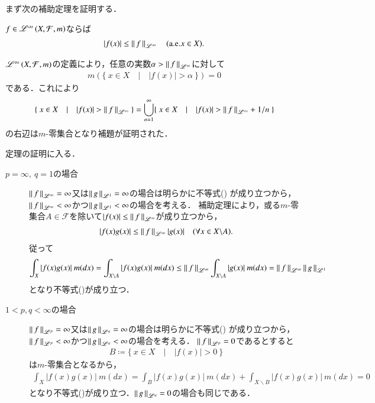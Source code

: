 \begin{prf}
	まず次の補助定理を証明する．
	\begin{lem}
		$f \in \mathscr{L}^{\infty} \left(X,\mathcal{F},m\right)$ならば
		\begin{align}
			|f(x)| \leq \left\|\, f\, \right\|_{\mathscr{L}^\infty} \quad (\mathrm{a.e.}x \in X).
		\end{align}
	\end{lem}
	\begin{prf}
		$\mathscr{L}^{\infty} \left(X,\mathcal{F},m\right)$の定義により，任意の実数$\alpha > \left\|\, f\, \right\|_{\mathscr{L}^\infty}$に対して
		\begin{align}
			m(\{\ x \in X\quad |\quad |f(x)| > \alpha\ \}) = 0
		\end{align}
		である．これにより
		\begin{align}
			\{\ x \in X\quad |\quad |f(x)| > \left\|\, f\, \right\|_{\mathscr{L}^\infty}\ \} = \bigcup_{n =1}^{\infty} \{\ x \in X\quad |\quad |f(x)| > \left\|\, f\, \right\|_{\mathscr{L}^\infty} + 1/n\ \}
		\end{align}
		の右辺は$m$-零集合となり補題が証明された．
		\QED
	\end{prf}
	
	定理の証明に入る．\mbox{}\\
	\begin{description}
		\item[$p = \infty,\ q = 1$の場合]
			$\left\|\, f\, \right\|_{\mathscr{L}^\infty} = \infty$又は$\left\|\, g\, \right\|_{\mathscr{L}^1} = \infty$の場合は明らかに不等式()
			が成り立つから，$\left\|\, f\, \right\|_{\mathscr{L}^\infty} < \infty$かつ$\left\|\, g\, \right\|_{\mathscr{L}^1} < \infty$の場合を考える．
			補助定理により，或る$m$-零集合$A \in \mathcal{F}$を除いて$|f(x)| \leq \left\|\, f\, \right\|_{\mathscr{L}^\infty}$が成り立つから，
			\begin{align}
				|f(x)g(x)| \leq \left\|\, f\, \right\|_{\mathscr{L}^\infty}|g(x)| \quad (\forall x \in X \backslash A).
			\end{align}
			従って
			\begin{align}
				\int_{X} |f(x)g(x)|\ m(dx) = \int_{X \backslash A} |f(x)g(x)|\ m(dx) \leq \left\|\, f\, \right\|_{\mathscr{L}^\infty} \int_{X \backslash A} |g(x)|\ m(dx) 
				= \left\|\, f\, \right\|_{\mathscr{L}^\infty} \left\|\, g\, \right\|_{\mathscr{L}^1}
			\end{align}
			となり不等式()が成り立つ．
		
		\item[$1 < p,q < \infty$の場合]
			$\left\|\, f\, \right\|_{\mathscr{L}^p} = \infty$又は$\left\|\, g\, \right\|_{\mathscr{L}^q} = \infty$の場合は明らかに不等式()
			が成り立つから，$\left\|\, f\, \right\|_{\mathscr{L}^p} < \infty$かつ$\left\|\, g\, \right\|_{\mathscr{L}^q} < \infty$の場合を考える．
			$\left\|\, f\, \right\|_{\mathscr{L}^p} = 0$であるとすると
			\begin{align}
				B \coloneqq \{\ x \in X\quad |\quad |f(x)| > 0\ \}
			\end{align}
			は$m$-零集合となるから，
			\begin{align}
				\int_{X} |f(x)g(x)|\ m(dx) = \int_{B} |f(x)g(x)|\ m(dx) + \int_{X \backslash B} |f(x)g(x)|\ m(dx) = 0
			\end{align}
			となり不等式()が成り立つ．$\left\|\, g\, \right\|_{\mathscr{L}^q} = 0$の場合も同じである．
			

\end{description}
\end{prf}
